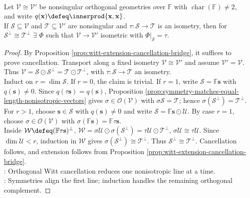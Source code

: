 \begin{theorem} \label{thm:orthogonal-witt-cancellation-and-extension} \\
Let $\mathcal{V}\cong\mathcal{V}'$ be nonsingular orthogonal geometries over $\mathbb{F}$ with $\operatorname{char}(\mathbb{F})\neq2$, and write $q(\mathbf{x})\defeq\innerprod{\mathbf{x},\mathbf{x}}$.\\
If $\mathcal{S}\subseteq\mathcal{V}$ and $\mathcal{T}\subseteq\mathcal{V}'$ are nonsingular and $\tau:\mathcal{S}\to\mathcal{T}$ is an isometry, then for $\mathcal{S}^{\perp}\cong\mathcal{T}^{\perp}$ $\exists$ $\Phi$ such that $\mathcal{V}\to\mathcal{V}'$ isometric with $\Phi|_{\mathcal{S}}=\tau$.
\begin{proof}
By Proposition \ref{prop:witt-extension-cancellation-bridge}, it suffices to prove cancellation. Transport along a fixed isometry $\mathcal{V}\cong\mathcal{V}'$ and assume $\mathcal{V}'=\mathcal{V}$. Thus $\mathcal{V}=\mathcal{S}\odot\mathcal{S}^{\perp} =\mathcal{T}\odot\mathcal{T}^{\perp}$, with $\tau:\mathcal{S}\to\mathcal{T}$ an isometry.\\
Induct on $r=\dim\mathcal{S}$. If $r=0$, the claim is trivial. If $r=1$, write $\mathcal{S}=\mathbb{F}\mathbf{s}$ with $q(\mathbf{s})\neq0$. Since $q(\tau\mathbf{s})=q(\mathbf{s})$, Proposition \ref{prop:symmetry-matches-equal-length-nonisotropic-vectors} gives $\sigma\in\mathcal{O}(\mathcal{V})$ with $\sigma\mathcal{S}=\mathcal{T}$; hence $\sigma(\mathcal{S}^{\perp})=\mathcal{T}^{\perp}$.\\
For $r>1$, choose $\mathbf{s}\in\mathcal{S}$ with $q(\mathbf{s})\neq0$ and write $\mathcal{S}=\mathbb{F}\mathbf{s}\odot\mathcal{U}$. By case $r=1$, choose $\sigma\in\mathcal{O}(\mathcal{V})$ with $\sigma(\mathbb{F}\mathbf{s})=\mathbb{F}\tau\mathbf{s}$.\\
Inside $\mathcal{W}\defeq(\mathbb{F}\tau\mathbf{s})^{\perp}$, $\mathcal{W} = \sigma\mathcal{U}\odot\sigma(\mathcal{S}^{\perp}) = \tau\mathcal{U}\odot\mathcal{T}^{\perp}$, $\sigma\mathcal{U}\cong\tau\mathcal{U}$. Since $\dim\mathcal{U}<r$, induction in $\mathcal{W}$ gives $\sigma(\mathcal{S}^{\perp})\cong\mathcal{T}^{\perp}$. Thus $\mathcal{S}^{\perp}\cong\mathcal{T}^{\perp}$. Cancellation follows, and extension follows from Proposition \ref{prop:witt-extension-cancellation-bridge}.\\
: Orthogonal Witt cancellation reduces one nonisotropic line at a time.\\
: Symmetries align the first line; induction handles the remaining orthogonal complement.
\end{proof}
\end{theorem}

